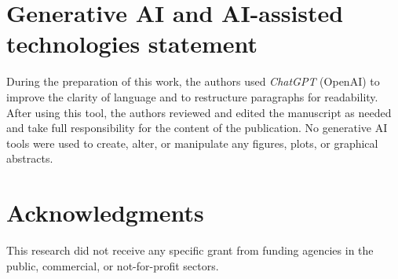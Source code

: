 \documentclass[review,3p,times]{elsarticle}
\begin{document}
\section*{Generative AI and AI-assisted technologies statement}
During the preparation of this work, the authors used \textit{ChatGPT} (OpenAI) to improve the clarity of language and to restructure paragraphs for readability. After using this tool, the authors reviewed and edited the manuscript as needed and take full responsibility for the content of the publication. No generative AI tools were used to create, alter, or manipulate any figures, plots, or graphical abstracts.

\section*{Acknowledgments}
This research did not receive any specific grant from funding agencies in the public, commercial, or not-for-profit sectors.


\end{document}

